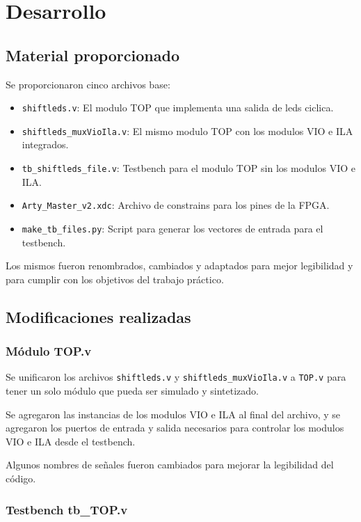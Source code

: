 \documentclass[11pt,a4paper]{article}
\begin{document}
\section{Desarrollo}

\subsection{Material proporcionado}

Se proporcionaron cinco archivos base:

\begin{itemize}
    \item \texttt{shiftleds.v}: El modulo TOP que implementa una salida de leds ciclica.
    \item \texttt{shiftleds\_muxVioIla.v}: El mismo modulo TOP con los modulos VIO e ILA integrados.
    \item \texttt{tb\_shiftleds\_file.v}: Testbench para el modulo TOP sin los modulos VIO e ILA.\@
    \item \texttt{Arty\_Master\_v2.xdc}: Archivo de constrains para los pines de la FPGA.\@
    \item \texttt{make\_tb\_files.py}: Script para generar los vectores de entrada para el testbench.
\end{itemize}

Los mismos fueron renombrados, cambiados y adaptados para mejor legibilidad y
para cumplir con los objetivos del trabajo práctico.

\subsection{Modificaciones realizadas}

\subsubsection{Módulo TOP.v}

Se unificaron los archivos \texttt{shiftleds.v} y
\texttt{shiftleds\_muxVioIla.v} a \texttt{TOP.v} para tener un solo módulo que
pueda ser simulado y sintetizado.

Se agregaron las instancias de los modulos VIO e ILA al final del archivo, y se
agregaron los puertos de entrada y salida necesarios para controlar los modulos
VIO e ILA desde el testbench.

Algunos nombres de señales fueron cambiados para mejorar la legibilidad del
código.

\subsubsection{Testbench tb\_TOP.v}
\end{document}
